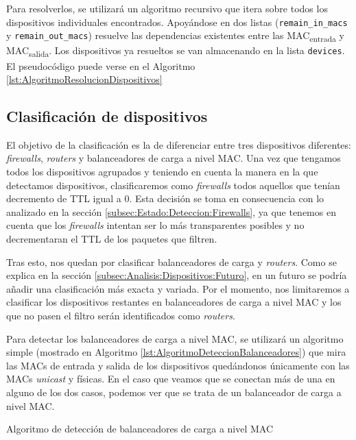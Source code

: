 \documentclass[tfg,epsbased,lof,lot,loa,final,nocopyright,overleaf]{tfgtfmthesisuam}
\begin{document}
Para resolverlos, se utilizará un algoritmo recursivo que itera sobre todos los dispositivos individuales encontrados. Apoyándose en dos listas (\texttt{remain\_in\_macs} y \texttt{remain\_out\_macs}) resuelve las dependencias existentes entre las MAC\textsubscript{entrada} y MAC\textsubscript{salida}. Los dispositivos ya resueltos se van almacenando en la lista \texttt{devices}. El pseudocódigo puede verse en el Algoritmo \ref{lst:AlgoritmoResolucionDispositivos}

\subsection{Clasificación de dispositivos}
El objetivo de la clasificación es la de diferenciar entre tres dispositivos diferentes: \textit{firewalls}, \textit{routers} y balanceadores de carga a nivel MAC. Una vez que tengamos todos los dispositivos agrupados y teniendo en cuenta la manera en la que detectamos dispositivos, clasificaremos como \textit{firewalls} todos aquellos que tenían decremento de TTL igual a 0. Esta decisión se toma en consecuencia con lo analizado en la sección \ref{subsec:Estado:Deteccion:Firewalls}, ya que tenemos en cuenta que los \textit{firewalls} intentan ser lo más transparentes posibles y no decrementaran el TTL de los paquetes que filtren.

Tras esto, nos quedan por clasificar balanceadores de carga y \textit{routers}. Como se explica en la sección \ref{subsec:Analisis:Dispositivos:Futuro}, en un futuro se podría añadir una clasificación más exacta y variada. Por el momento, nos limitaremos a clasificar los dispositivos restantes en balanceadores de carga a nivel MAC y los que no pasen el filtro serán identificados como \textit{routers}.

Para detectar los balanceadores de carga a nivel MAC, se utilizará un algoritmo simple (mostrado en Algoritmo \ref{lst:AlgoritmoDeteccionBalanceadores}) que mira las MACs de entrada y salida de los dispositivos quedándonos únicamente con las MACs \textit{unicast} y físicas. En el caso que veamos que se conectan más de una en alguno de los dos casos, podemos ver que se trata de un balanceador de carga a nivel MAC.

\begin{algorithm}{}{Algoritmo de detección de balanceadores de carga a nivel MAC}
\end{algorithm}
\end{document}
